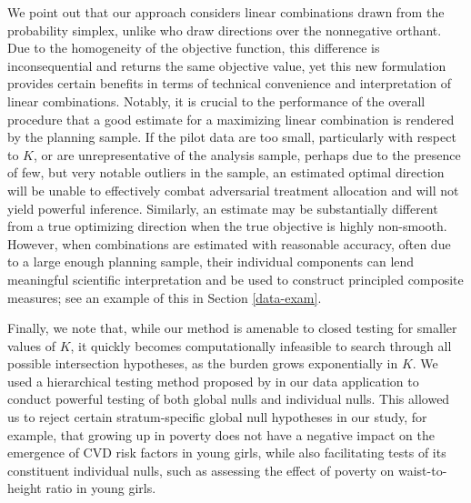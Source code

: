 \documentclass[12pt,leqno,titlepage]{amsart}
\newcommand{\1}{\mathbbm{1}}
\begin{document}
\begin{bibunit}
We point out that our approach considers linear combinations drawn from the probability simplex, unlike \cite{cohen2020multivariate} who draw directions over the nonnegative orthant. Due to the homogeneity of the objective function, this difference is inconsequential and returns the same objective value, yet this new formulation provides certain benefits in terms of technical convenience and interpretation of linear combinations. Notably, it is crucial to the performance of the overall procedure that a good estimate for a maximizing linear combination is rendered by the planning sample. If the pilot data are too small, particularly with respect to $K$, or are unrepresentative of the analysis sample, perhaps due to the presence of few, but very notable outliers in the sample, an estimated optimal direction will be unable to effectively combat adversarial treatment allocation and will not yield powerful inference. Similarly, an estimate may be substantially different from a true optimizing direction when the true objective is highly non-smooth. However, when combinations are estimated with reasonable accuracy, often due to a large enough planning sample, their individual components can lend meaningful scientific interpretation \citep{ye2022dimensions} and be used to construct principled composite measures; see an example of this in Section \ref{data-exam}. 

Finally, we note that, while our method is amenable to closed testing \citep{marcus1976closed} for smaller values of $K$, it quickly becomes computationally infeasible to search through all possible intersection hypotheses, as the burden grows exponentially in $K$. We used a hierarchical testing method proposed by \cite{goeman2012inheritance} in our data application to conduct powerful testing of both global nulls and individual nulls. This allowed us to reject certain stratum-specific global null hypotheses in our study, for example, that growing up in poverty does not have a negative impact on the emergence of CVD risk factors in young girls, while also facilitating tests of its constituent individual nulls, such as assessing the effect of poverty on waist-to-height ratio in young girls. 



\end{bibunit}
\end{document}
